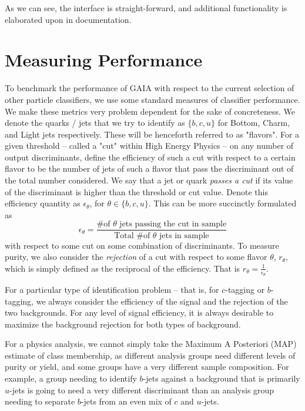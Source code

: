 As we can see, the interface is straight-forward, and additional functionality is elaborated upon in documentation. 

\section{Measuring Performance}

To benchmark the performance of GAIA with respect to the current selection of other particle classifiers,  we use some standard measures of classifier performance. We make these metrics very problem dependent for the sake of concreteness. We denote the quarks / jets that we try to identify as $\{b,c,u\}$ for Bottom, Charm, and Light jets respectively. These will be henceforth referred to as "flavors". For a given threshold -- called a "cut" within High Energy Physics -- on any number of output discriminants, define the efficiency of such a cut with respect to a certain flavor to be the number of jets of such a flavor that pass the discriminant out of the total number considered. We say that a jet or quark \emph{passes a cut} if its value of the discriminant is higher than the threshold or cut value.  Denote this efficiency quantity as $\epsilon_\theta$, for $\theta\in\{b,c,u\}$. This can be more succinctly formulated as
\begin{equation}
\epsilon_\theta = \frac{\text{\# of }\theta\text{ jets passing the cut in sample}}{\text{Total \# of }\theta\text{ jets in sample}}
\end{equation}
 with respect to some cut on some combination of discriminants. To measure purity, we also consider the \emph{rejection} of a cut with respect to some flavor $\theta$, $r_\theta$, which is simply defined as the reciprocal of the efficiency. That is $r_\theta = \frac{1}{\epsilon_\theta}$.
 
For a particular type of identification problem -- that is, for $c$-tagging or $b$-tagging, we always consider the efficiency of the signal and the rejection of the two backgrounds. For any level of signal efficiency, it is always desirable to maximize the background rejection for both types of background. 

For a physics analysis, we cannot simply take the Maximum A Posteriori (MAP) estimate of class membership, as different analysis groups need different levels of purity or yield, and some groups have a very different sample composition. For example, a group needing to identify $b$-jets against a background that is primarily $u$-jets is going to need a very different discriminant than an analysis group needing to separate $b$-jets from an even mix of $c$ and $u$-jets. 






